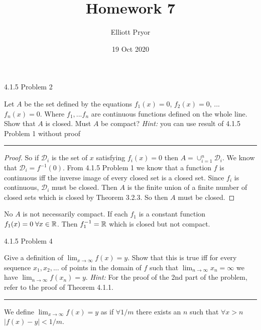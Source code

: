 \documentclass[11pt]{article}
\title{Homework 7}
\author{Elliott Pryor}
\date{19 Oct 2020}
\begin{document}
\maketitle

 4.1.5 Problem 2

Let $A$ be the set defined by the equations $f_1(x) = 0$, $f_2(x) = 0$, ... $f_n(x) = 0$. Where $f_1, ... f_n$ are continuous functions defined on the whole line. Show that $A$ is closed. Must $A$ be compact? \textit{Hint: } you can use result of 4.1.5 Problem 1 without proof
\hrule

\begin{proof}
So if $\mathcal{D}_i$ is the set of $x$ satisfying $f_i(x) = 0$ then $A = \cup_{i = 1}^n \mathcal{D}_i$. We know that $\mathcal{D}_i = f^{-1}(0)$. 
From 4.1.5 Problem 1 we know that a function $f$ is continuous iff the inverse image of every closed set is a closed set. Since $f_i$ is continuous, $\mathcal{D}_i$ must be closed. 
Then $A$ is the finite union of a finite number of closed sets which is closed by Theorem 3.2.3. So then $A$ must be closed.  
\end{proof}
 
No $A$ is not necessarily compact. If each $f_1$ is a constant function $f_1(x) = 0 \; \forall x \in \mathbb{R}$. Then $f_1^{-1} = \mathbb{R}$ which is closed but not compact.




\newpage
{} 4.1.5 Problem 4

Give a definition of $\lim_{x \to \infty} f(x) = y$. Show that this is true iff for every sequence $x_1, x_2, ...$ of points in the domain of $f$ such that $\lim_{n \to \infty} x_n = \infty$ we have $\lim_{n\to \infty} f(x_n) = y$. \textit{Hint: } For the proof of the 2nd part of the problem, refer to the proof of Theorem 4.1.1.
\hrule

We define $\lim_{x \to \infty} f(x) = y$ as if $\forall 1/m$ there exists an $n$ such that $\forall x > n$ $|f(x) - y| < 1/m$. 
\end{document}
